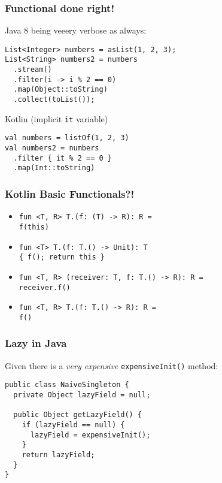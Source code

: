 \fulltitle{$\lambda$}

\begin{frame}[fragile] \frametitle{Functional done right!}
Java 8 being veeery verbose as always:
\begin{lstlisting}
List<Integer> numbers = asList(1, 2, 3);
List<String> numbers2 = numbers
  .stream()
  .filter(i -> i % 2 == 0)
  .map(Object::toString)
  .collect(toList());
\end{lstlisting}

Kotlin (implicit \texttt{it} variable)
\begin{lstlisting}
val numbers = listOf(1, 2, 3)
val numbers2 = numbers
  .filter { it % 2 == 0 }
  .map(Int::toString)
\end{lstlisting}
\end{frame}



	
\begin{frame}[fragile] \frametitle{Kotlin Basic Functionals?!}
\begin{itemize}
	\setlength\itemsep{1.5em}
	\item \texttt{fun <T, R> T.(f: (T) -> R): R = \\ f(this)}
	\item \texttt{fun <T> T.(f: T.() -> Unit): T \\ \{ f(); return this \}}
	\item \texttt{fun <T, R> (receiver: T, f: T.() -> R): R = \\ receiver.f()}
	\item \texttt{fun <T, R> T.(f: T.() -> R): R = \\ f()}
\end{itemize}
\end{frame}



\begin{frame}[fragile] \frametitle{Lazy in Java}
Given there is a \textit{very expensive} \texttt{expensiveInit()} method:
\pause
\begin{lstlisting}
public class NaiveSingleton {
  private Object lazyField = null;

  public Object getLazyField() {
    if (lazyField == null) {
      lazyField = expensiveInit();
    }
    return lazyField;
  }
}
\end{lstlisting}
\end{frame}


